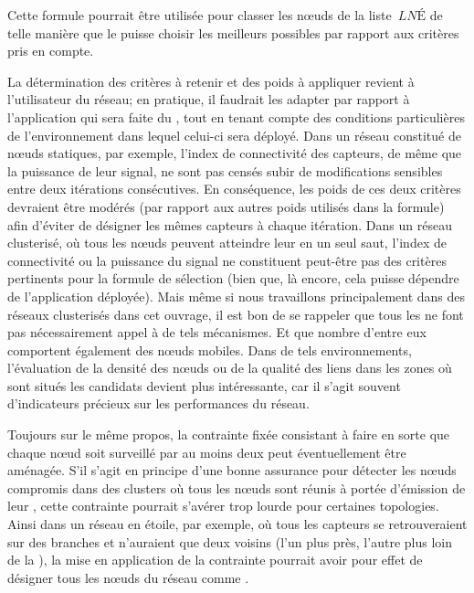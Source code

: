 Cette formule pourrait être utilisée pour classer les nœuds de la liste~$\mathit{LNÉ}$ de telle manière que le \ch puisse choisir les meilleurs \cns possibles par rapport aux critères pris en compte.

La détermination des critères à retenir et des poids à appliquer revient à l'utilisateur du réseau; en pratique, il faudrait les adapter par rapport à l'application qui sera faite du \rc, tout en tenant compte des conditions particulières de l'environnement dans lequel celui-ci sera déployé.
Dans un réseau constitué de nœuds statiques, par exemple, l'index de connectivité des capteurs, de même que la puissance de leur signal, ne sont pas censés subir de modifications sensibles entre deux itérations consécutives.
En conséquence, les poids de ces deux critères devraient être modérés (par rapport aux autres poids utilisés dans la formule) afin d'éviter de désigner les mêmes capteurs à chaque itération.
Dans un réseau clusterisé, où tous les nœuds peuvent atteindre leur \CH en un seul saut, l'index de connectivité ou la puissance du signal ne constituent peut-être pas des critères pertinents pour la formule de sélection (bien que, là encore, cela puisse dépendre de l'application déployée).
Mais même si nous travaillons principalement dans des réseaux clusterisés dans cet ouvrage, il est bon de se rappeler que tous les \rcs ne font pas nécessairement appel à de tels mécanismes.
Et que nombre d'entre eux comportent également des nœuds mobiles.
Dans de tels environnements, l'évaluation de la densité des nœuds ou de la qualité des liens dans les zones où sont situés les \cns candidats devient plus intéressante, car il s'agit souvent d'indicateurs précieux sur les performances du réseau.

Toujours sur le même propos, la contrainte fixée consistant à faire en sorte que chaque nœud soit surveillé par au moins deux \cns peut éventuellement être aménagée.
S'il s'agit en principe d'une bonne assurance pour détecter les nœuds compromis dans des clusters où tous les nœuds sont réunis à portée d'émission de leur \ch, cette contrainte pourrait s'avérer trop lourde pour certaines topologies.
Ainsi dans un réseau en étoile, par exemple, où tous les capteurs se retrouveraient sur des branches et n'auraient que deux voisins (l'un plus près, l'autre plus loin de la \sdb), la mise en application de la contrainte pourrait avoir pour effet de désigner tous les nœuds du réseau comme \cns.

